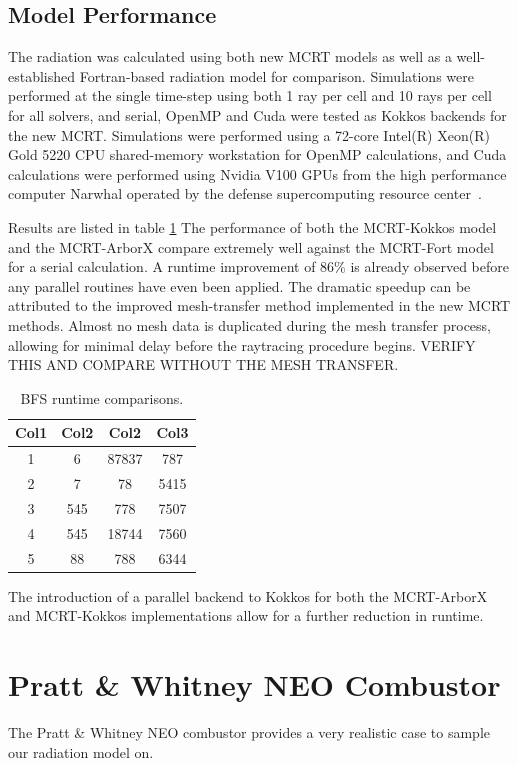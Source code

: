 \subsection{Model Performance}
The radiation was calculated using both new MCRT models as well as a well-established Fortran-based radiation model for comparison. Simulations were performed at the single time-step using both 1 ray per cell and 10 rays per cell for all solvers, and serial, OpenMP and Cuda were tested as Kokkos backends for the new MCRT. 
Simulations were performed using a 72-core Intel(R) Xeon(R) Gold 5220 CPU shared-memory workstation for OpenMP calculations, and Cuda calculations were performed using Nvidia V100 GPUs from the high performance computer Narwhal operated by the defense supercomputing resource center~\cite{something}.

Results are listed in table \ref{table:BFS_runtime_table} The performance of both the MCRT-Kokkos model and the MCRT-ArborX compare extremely well against the MCRT-Fort model for a serial calculation. A runtime improvement of 86\% is already observed before any parallel routines have even been applied.
The dramatic speedup can be attributed to the improved mesh-transfer method implemented in the new MCRT methods. 
Almost no mesh data is duplicated during the mesh transfer process, allowing for minimal delay before the raytracing procedure begins. VERIFY THIS AND COMPARE WITHOUT THE MESH TRANSFER.

\begin{table}[h!]
\centering
\begin{tabular}{||c c c c||} 
 \hline
 Col1 & Col2 & Col2 & Col3 \\ [0.5ex] 
 \hline\hline
 1 & 6 & 87837 & 787 \\ 
 2 & 7 & 78 & 5415 \\
 3 & 545 & 778 & 7507 \\
 4 & 545 & 18744 & 7560 \\
 5 & 88 & 788 & 6344 \\ [1ex] 
 \hline
\end{tabular}
\caption{BFS runtime comparisons.}
\label{table:BFS_runtime_table}
\end{table}


The introduction of a parallel backend to Kokkos for both the MCRT-ArborX and MCRT-Kokkos implementations allow for a further reduction in runtime.

\section{Pratt \& Whitney NEO Combustor}
The Pratt \& Whitney NEO combustor provides a very realistic case to sample our radiation model on.

